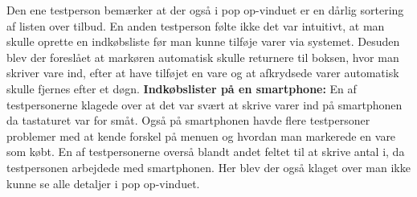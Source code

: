 Den ene testperson bemærker at der også i pop op-vinduet er en dårlig sortering af listen over tilbud. En anden testperson følte ikke det var intuitivt, at man skulle oprette en indkøbsliste før man kunne tilføje varer via systemet. Desuden blev der foreslået at markøren automatisk skulle returnere til boksen, hvor man skriver vare ind, efter at have tilføjet en vare og at afkrydsede varer automatisk skulle fjernes efter et døgn. \newline
\newline
\textbf{Indkøbslister på en smartphone:}\newline
En af testpersonerne klagede over at det var svært at skrive varer ind på smartphonen da tastaturet var for småt. Også på smartphonen havde flere testpersoner problemer med at kende forskel på menuen og hvordan man markerede en vare som købt. En af testpersonerne overså blandt andet feltet til at skrive antal i, da testpersonen arbejdede med smartphonen. Her blev der også klaget over man ikke kunne se alle detaljer i pop op-vinduet.

